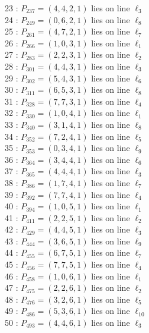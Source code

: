 \documentclass{article}
\begin{document}
{\begin{multicols}{2}
23 : $P_{237}=( 4, 4, 2, 1 )$ lies on line $\ell_{3}$\\
24 : $P_{249}=( 0, 6, 2, 1 )$ lies on line $\ell_{8}$\\
25 : $P_{261}=( 4, 7, 2, 1 )$ lies on line $\ell_{7}$\\
26 : $P_{266}=( 1, 0, 3, 1 )$ lies on line $\ell_{1}$\\
27 : $P_{283}=( 2, 2, 3, 1 )$ lies on line $\ell_{2}$\\
28 : $P_{301}=( 4, 4, 3, 1 )$ lies on line $\ell_{3}$\\
29 : $P_{302}=( 5, 4, 3, 1 )$ lies on line $\ell_{6}$\\
30 : $P_{311}=( 6, 5, 3, 1 )$ lies on line $\ell_{8}$\\
31 : $P_{328}=( 7, 7, 3, 1 )$ lies on line $\ell_{4}$\\
32 : $P_{330}=( 1, 0, 4, 1 )$ lies on line $\ell_{1}$\\
33 : $P_{340}=( 3, 1, 4, 1 )$ lies on line $\ell_{8}$\\
34 : $P_{352}=( 7, 2, 4, 1 )$ lies on line $\ell_{5}$\\
35 : $P_{353}=( 0, 3, 4, 1 )$ lies on line $\ell_{9}$\\
36 : $P_{364}=( 3, 4, 4, 1 )$ lies on line $\ell_{6}$\\
37 : $P_{365}=( 4, 4, 4, 1 )$ lies on line $\ell_{3}$\\
38 : $P_{386}=( 1, 7, 4, 1 )$ lies on line $\ell_{7}$\\
39 : $P_{392}=( 7, 7, 4, 1 )$ lies on line $\ell_{4}$\\
40 : $P_{394}=( 1, 0, 5, 1 )$ lies on line $\ell_{1}$\\
41 : $P_{411}=( 2, 2, 5, 1 )$ lies on line $\ell_{2}$\\
42 : $P_{429}=( 4, 4, 5, 1 )$ lies on line $\ell_{3}$\\
43 : $P_{444}=( 3, 6, 5, 1 )$ lies on line $\ell_{9}$\\
44 : $P_{455}=( 6, 7, 5, 1 )$ lies on line $\ell_{7}$\\
45 : $P_{456}=( 7, 7, 5, 1 )$ lies on line $\ell_{4}$\\
46 : $P_{458}=( 1, 0, 6, 1 )$ lies on line $\ell_{1}$\\
47 : $P_{475}=( 2, 2, 6, 1 )$ lies on line $\ell_{2}$\\
48 : $P_{476}=( 3, 2, 6, 1 )$ lies on line $\ell_{5}$\\
49 : $P_{486}=( 5, 3, 6, 1 )$ lies on line $\ell_{10}$\\
50 : $P_{493}=( 4, 4, 6, 1 )$ lies on line $\ell_{3}$\\

\end{multicols}}
\end{document}
